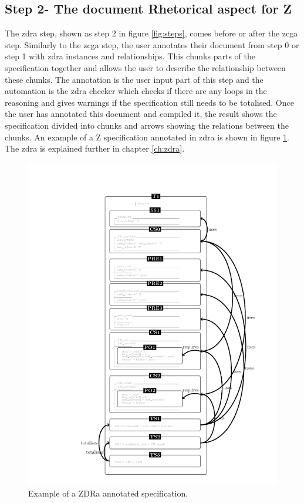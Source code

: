 \subsection{Step 2- The document Rhetorical aspect for Z}

The \gls{zdra} step, shown as step 2 in figure \ref{fig:steps}, comes before or
after the \gls{zcga} step. Similarly to the \gls{zcga} step, the user annotates
their document from step 0 or step 1 with \gls{zdra} instances and
relationships. This chunks parts of the specification together and allows the
user to describe the relationship between these chunks. The annotation is the
user input part of this step and the automation is the \gls{zdra} checker which
checks if there are any loops in the reasoning and gives warnings if the
specification still needs to be totalised. Once the user has annotated this
document and compiled it, the result shows the specification divided
into chunks and arrows showing the relations between the chunks. An example of a
Z specification annotated in \gls{zdra} is shown in figure
\ref{fig:zdraexample}. The \gls{zdra} is explained further in chapter
\ref{ch:zdra}.

\begin{figure}[H]
 \begin{center}
 \includegraphics [scale=0.25]{Figures/Design/zdracomp.png}
 \caption{Example of a ZDRa annotated specification.}
 \label{fig:zdraexample}
\end{center}
\end{figure} 

